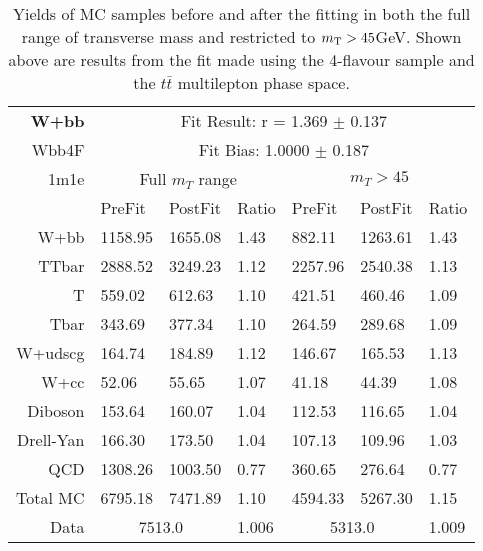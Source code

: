 \begin{table}[htb]
\begin{center}
\begin{tabular}{r|l|l|l|l|l|l}
\bf{W+bb} & \multicolumn{6}{c}{Fit Result: r = 1.369 $\pm$ 0.137}\\ 
Wbb4F & \multicolumn{6}{c}{Fit Bias: 1.0000 $\pm$ 0.187}\\ 
1m1e & \multicolumn{3}{c}{Full $m_T$ range} & \multicolumn{3}{c}{$m_T>45$}\\ 
{} & PreFit & PostFit & Ratio & PreFit & PostFit & Ratio \\ \hline 
W+bb  &	 1158.95 &	 1655.08 &	 1.43 &	 882.11 &	 1263.61 &	 1.43\\ 
TTbar  &	 2888.52 &	 3249.23 &	 1.12 &	 2257.96 &	 2540.38 &	 1.13\\ 
T  &	 559.02 &	 612.63 &	 1.10 &	 421.51 &	 460.46 &	 1.09\\ 
Tbar  &	 343.69 &	 377.34 &	 1.10 &	 264.59 &	 289.68 &	 1.09\\ 
W+udscg  &	 164.74 &	 184.89 &	 1.12 &	 146.67 &	 165.53 &	 1.13\\ 
W+cc  &	 52.06 &	 55.65 &	 1.07 &	 41.18 &	 44.39 &	 1.08\\ 
Diboson  &	 153.64 &	 160.07 &	 1.04 &	 112.53 &	 116.65 &	 1.04\\ 
Drell-Yan  &	 166.30 &	 173.50 &	 1.04 &	 107.13 &	 109.96 &	 1.03\\ 
QCD  &	 1308.26 &	 1003.50 &	 0.77 &	 360.65 &	 276.64 &	 0.77\\ 
Total MC  &	 6795.18 &	 7471.89 &	 1.10 &	 4594.33 &	 5267.30 &	 1.15\\ 
\hline \hline 
Data & \multicolumn{2}{c|}{7513.0} & 1.006 & \multicolumn{2}{c|}{5313.0} & 1.009 
\end{tabular}
\caption{
 Yields of MC samples before and after the fitting
  in both the full range of transverse mass and restricted 
  to $m_\mathrm{T}>45$GeV.
 Shown above are results from the fit made using the 4-flavour \Wbb sample and the
  $t\bar{t}$ multilepton phase space.}
\label{tab:fitYields_4F_1m1e}
\end{center}
\end{table}

